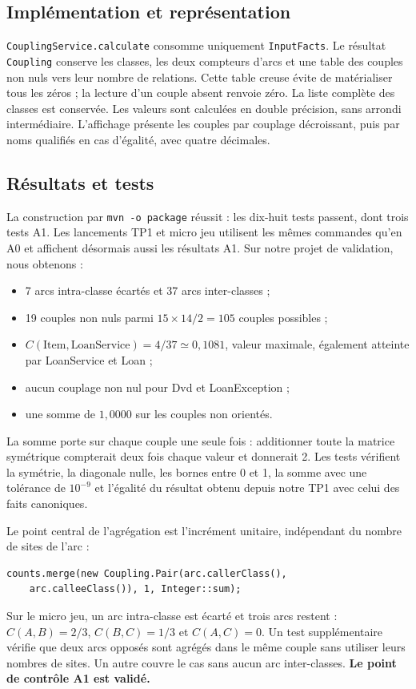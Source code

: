 \documentclass[11pt,a4paper]{article}
\begin{document}
\subsection{Implémentation et représentation}
\texttt{CouplingService.calculate} consomme uniquement \texttt{InputFacts}.
Le résultat \texttt{Coupling} conserve les classes, les deux compteurs d'arcs
et une table des couples non nuls vers leur nombre de relations.
Cette table creuse évite de matérialiser tous les zéros ; la lecture d'un
couple absent renvoie zéro. La liste complète des classes est conservée.
Les valeurs sont calculées en double précision, sans arrondi intermédiaire.
L'affichage présente les couples par couplage décroissant, puis par noms
qualifiés en cas d'égalité, avec quatre décimales.

\subsection{Résultats et tests}
La construction par \texttt{mvn -o package} réussit : les dix-huit tests
passent, dont trois tests A1. Les lancements TP1 et micro jeu utilisent les
mêmes commandes qu'en A0 et affichent désormais aussi les résultats A1.
Sur notre projet de validation, nous obtenons :
\begin{itemize}
\item 7 arcs intra-classe écartés et 37 arcs inter-classes ;
\item 19 couples non nuls parmi $15\times14/2=105$ couples possibles ;
\item $C(\mathrm{Item},\mathrm{LoanService})=4/37\simeq0{,}1081$,
valeur maximale, également atteinte par LoanService et Loan ;
\item aucun couplage non nul pour Dvd et LoanException ;
\item une somme de $1{,}0000$ sur les couples non orientés.
\end{itemize}
La somme porte sur chaque couple une seule fois : additionner toute la matrice
symétrique compterait deux fois chaque valeur et donnerait 2.
Les tests vérifient la symétrie, la diagonale nulle, les bornes entre 0 et 1,
la somme avec une tolérance de $10^{-9}$ et l'égalité du résultat obtenu depuis
notre TP1 avec celui des faits canoniques.

Le point central de l'agrégation est l'incrément unitaire, indépendant du
nombre de sites de l'arc :
\begin{verbatim}
counts.merge(new Coupling.Pair(arc.callerClass(),
    arc.calleeClass()), 1, Integer::sum);
\end{verbatim}
Sur le micro jeu, un arc intra-classe est écarté et trois arcs restent :
$C(A,B)=2/3$, $C(B,C)=1/3$ et $C(A,C)=0$.
Un test supplémentaire vérifie que deux arcs opposés sont agrégés dans le
même couple sans utiliser leurs nombres de sites. Un autre couvre le cas
sans aucun arc inter-classes. \textbf{Le point de contrôle A1 est validé.}
\end{document}
